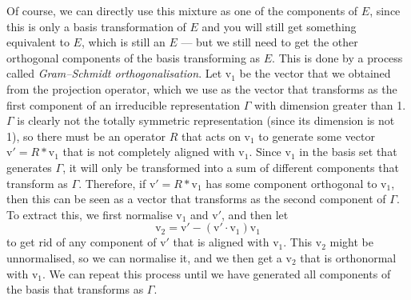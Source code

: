 \documentclass{article}
\theoremstyle{plain}\theoremheaderfont{\normalfont\itshape}\theorembodyfont{\rmfamily}\theoremseparator{.}\newtheorem*{rem}{Remark}\newtheorem*{ex}{Example}\newtheorem*{proof}{Proof}\newtheorem*{altp}{Alternative proof}
\theoremstyle{plain}\theoremheaderfont{\normalfont\bfseries}\theorembodyfont{\rmfamily}\theoremseparator{.}\newtheorem{thm}{Theorem}[section]\newtheorem{lem}[thm]{Lemma}\newtheorem{prop}[thm]{Proposition}\newtheorem*{cor}{Corollary}\newtheorem{defn}[thm]{Definition}\newtheorem{clm}[thm]{Claim}\newtheorem{clminproof}{Claim}\newtheorem*{law}{Law}\newtheorem{pos}[thm]{Postulate}
\theoremstyle{break}\theoremheaderfont{\normalfont\itshape}\theorembodyfont{\rmfamily}\theoremseparator{.\medskip}\newtheorem*{proofskip}{Proof}\newtheorem*{exs}{Examples}\newtheorem*{rems}{Remarks}
\theoremstyle{break}\theoremheaderfont{\normalfont\bfseries}\theorembodyfont{\rmfamily}\theoremseparator{.\medskip}\newtheorem{lemskip}[thm]{Lemma}\newtheorem{defnskip}[thm]{Definition}\newtheorem{propskip}[thm]{Proposition}\newtheorem{thmskip}[thm]{Theorem}
\numberwithin{equation}{section}
\newcommand{\vb}[1]{\bm{\mathrm{#1}}}
\newcommand{\vdot}{\,\bm{\mathrm{\cdot}}\,}
\begin{document}
    Of course, we can directly use this mixture as one of the components of \(E\), since this is only a basis transformation of \(E\) and you will still get something equivalent to \(E\), which is still an \(E\) --- but we still need to get the other orthogonal components of the basis transforming as \(E\). This is done by a process called \textit{Gram--Schmidt orthogonalisation}. Let \(\vb{v}_1\) be the vector that we obtained from the projection operator, which we use as the vector that transforms as the first component of an irreducible representation \(\Gamma\) with dimension greater than 1. \(\Gamma\) is clearly not the totally symmetric representation (since its dimension is not 1), so there must be an operator \(R\) that acts on \(\vb{v}_1\) to generate some vector \(\vb{v}'=R*\vb{v}_1\) that is not completely aligned with \(\vb{v}_1\). Since \(\vb{v}_1\) in the basis set that generates \(\Gamma\), it will only be transformed into a sum of different components that transform as \(\Gamma\). Therefore, if \(\vb{v}'=R * \vb{v}_1\) has some component orthogonal to \(\vb{v}_1\), then this can be seen as a vector that transforms as the second component of \(\Gamma\). To extract this, we first normalise \(\vb{v}_1\) and \(\vb{v}'\), and then let
    \begin{equation}
        \vb{v}_2=\vb{v}'-(\vb{v}'\vdot\vb{v}_1)\vb{v}_1
    \end{equation}
    to get rid of any component of \(\vb{v}'\) that is aligned with \(\vb{v}_1\). This \(\vb{v}_2\) might be unnormalised, so we can normalise it, and we then get a \(\vb{v}_2\) that is orthonormal with \(\vb{v}_1\). We can repeat this process until we have generated all components of the basis that transforms as \(\Gamma\).
\end{document}
